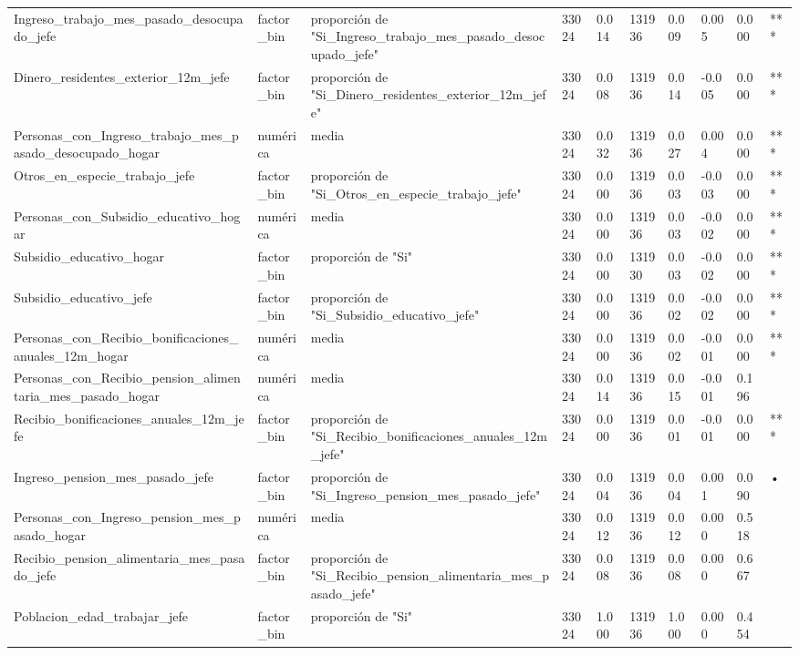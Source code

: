 \begin{longtable}[t]{llllllllll}
Ingreso\_trabajo\_mes\_pasado\_desocupado\_jefe & factor\_bin & proporción de "Si\_Ingreso\_trabajo\_mes\_pasado\_desocupado\_jefe" & 33024 & 0.014 & 131936 & 0.009 & 0.005 & 0.000 & ***\\
Dinero\_residentes\_exterior\_12m\_jefe & factor\_bin & proporción de "Si\_Dinero\_residentes\_exterior\_12m\_jefe" & 33024 & 0.008 & 131936 & 0.014 & -0.005 & 0.000 & ***\\
Personas\_con\_Ingreso\_trabajo\_mes\_pasado\_desocupado\_hogar & numérica & media & 33024 & 0.032 & 131936 & 0.027 & 0.004 & 0.000 & ***\\
Otros\_en\_especie\_trabajo\_jefe & factor\_bin & proporción de "Si\_Otros\_en\_especie\_trabajo\_jefe" & 33024 & 0.000 & 131936 & 0.003 & -0.003 & 0.000 & ***\\
Personas\_con\_Subsidio\_educativo\_hogar & numérica & media & 33024 & 0.000 & 131936 & 0.003 & -0.002 & 0.000 & ***\\
Subsidio\_educativo\_hogar & factor\_bin & proporción de "Si" & 33024 & 0.000 & 131930 & 0.003 & -0.002 & 0.000 & ***\\
Subsidio\_educativo\_jefe & factor\_bin & proporción de "Si\_Subsidio\_educativo\_jefe" & 33024 & 0.000 & 131936 & 0.002 & -0.002 & 0.000 & ***\\
Personas\_con\_Recibio\_bonificaciones\_anuales\_12m\_hogar & numérica & media & 33024 & 0.000 & 131936 & 0.002 & -0.001 & 0.000 & ***\\
Personas\_con\_Recibio\_pension\_alimentaria\_mes\_pasado\_hogar & numérica & media & 33024 & 0.014 & 131936 & 0.015 & -0.001 & 0.196 & \\
Recibio\_bonificaciones\_anuales\_12m\_jefe & factor\_bin & proporción de "Si\_Recibio\_bonificaciones\_anuales\_12m\_jefe" & 33024 & 0.000 & 131936 & 0.001 & -0.001 & 0.000 & ***\\
Ingreso\_pension\_mes\_pasado\_jefe & factor\_bin & proporción de "Si\_Ingreso\_pension\_mes\_pasado\_jefe" & 33024 & 0.004 & 131936 & 0.004 & 0.001 & 0.090 & •\\
Personas\_con\_Ingreso\_pension\_mes\_pasado\_hogar & numérica & media & 33024 & 0.012 & 131936 & 0.012 & 0.000 & 0.518 & \\
Recibio\_pension\_alimentaria\_mes\_pasado\_jefe & factor\_bin & proporción de "Si\_Recibio\_pension\_alimentaria\_mes\_pasado\_jefe" & 33024 & 0.008 & 131936 & 0.008 & 0.000 & 0.667 & \\
Poblacion\_edad\_trabajar\_jefe & factor\_bin & proporción de "Si" & 33024 & 1.000 & 131936 & 1.000 & 0.000 & 0.454 & \\*
\end{longtable}
